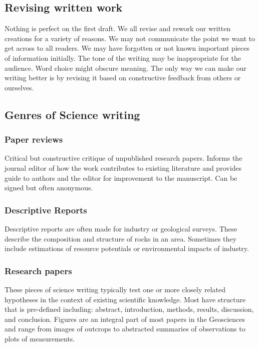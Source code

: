 \documentclass[11pt,]{article}
\begin{document}
\subsection{Revising written work}\label{revising-written-work}

Nothing is perfect on the first draft. We all revise and rework our
written creations for a variety of reasons. We may not communicate the
point we want to get across to all readers. We may have forgotten or not
known important pieces of information initially. The tone of the writing
may be inappropriate for the audience. Word choice might obscure
meaning. The only way we can make our writing better is by revising it
based on constructive feedback from others or ourselves.

\subsection{Genres of Science writing}\label{genres-of-science-writing}

\subsubsection{Paper reviews}\label{paper-reviews}

Critical but constructive critique of unpublished research papers.
Informs the journal editor of how the work contributes to existing
literature and provides guide to authors and the editor for improvement
to the manuscript. Can be signed but often anonymous.

\subsubsection{Descriptive Reports}\label{descriptive-reports}

Descriptive reports are often made for industry or geological surveys.
These describe the composition and structure of rocks in an area.
Sometimes they include estimations of resource potentials or
environmental impacts of industry.

\subsubsection{Research papers}\label{research-papers}

These pieces of science writing typically test one or more closely
related hypotheses in the context of existing scientific knowledge. Most
have structure that is pre-defined including: abstract, introduction,
methods, results, discussion, and conclusion. Figures are an integral
part of most papers in the Geosciences and range from images of outcrops
to abstracted summaries of observations to plots of measurements.
\end{document}
